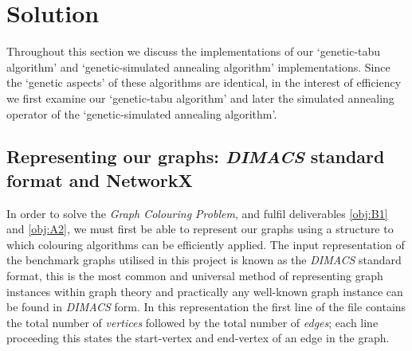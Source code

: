 \documentclass[12pt,a4paper]{article}
\begin{document}
\section{Solution}

Throughout this section we discuss the implementations of our `genetic-tabu algorithm' and `genetic-simulated annealing algorithm' implementations. Since the `genetic aspects' of these algorithms are identical, in the interest of efficiency we first examine our `genetic-tabu algorithm' and later the simulated annealing operator of the `genetic-simulated annealing algorithm'.

\subsection*{Representing our graphs: \textit{DIMACS} standard format and NetworkX}

In order to solve the \textit{Graph Colouring Problem}, and fulfil deliverables \ref{obj:B1} and \ref{obj:A2}, we must first be able to represent our graphs using a structure to which colouring algorithms can be efficiently applied. The input representation of the benchmark graphs utilised in this project is known as the \textit{DIMACS} standard format, this is the most common and universal method of representing graph instances within graph theory and practically any well-known graph instance can be found in \textit{DIMACS} form. In this representation the first line of the file contains the total number of \textit{vertices} followed by the total number of \textit{edges}; each line proceeding this states the start-vertex and end-vertex of an edge in the graph.
\end{document}
